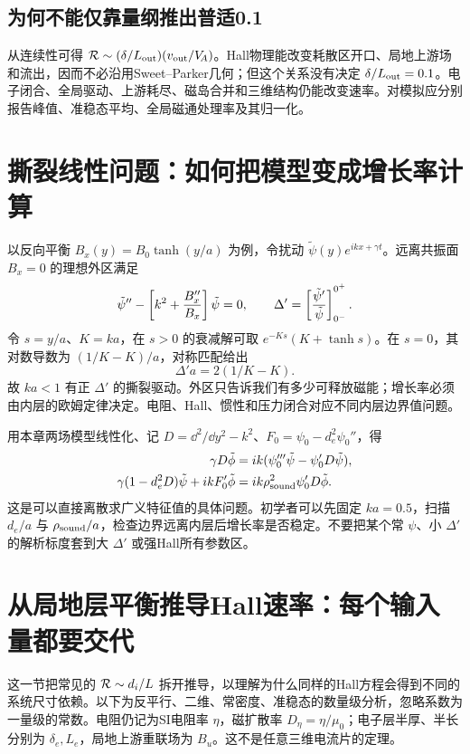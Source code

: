 \subsection{为何不能仅靠量纲推出普适0.1}
从连续性可得 $\mathcal R\sim(\delta/L_{\rm out})(v_{\rm out}/V_{\!A})$。Hall物理能改变耗散区开口、局地上游场和流出，因而不必沿用Sweet--Parker几何；但这个关系没有决定 $\delta/L_{\rm out}=0.1$。电子闭合、全局驱动、上游耗尽、磁岛合并和三维结构仍能改变速率。对模拟应分别报告峰值、准稳态平均、全局磁通处理率及其归一化。



\section{撕裂线性问题：如何把模型变成增长率计算}
以反向平衡 $B_x(y)=B_0\tanh(y/a)$ 为例，令扰动 $\tilde\psi(y)e^{ikx+\gamma t}$。远离共振面 $B_x=0$ 的理想外区满足
\begin{equation}\tilde\psi''-\left[k^2+{B_x''\over B_x}\right]\tilde\psi=0,\qquad
\Delta'=\left[{\tilde\psi'\over\tilde\psi}\right]_{0^-}^{0^+}.
\end{equation}
令 $s=y/a$、$K=ka$，在 $s>0$ 的衰减解可取 $e^{-Ks}(K+\tanh s)$。在 $s=0$，其对数导数为 $(1/K-K)/a$，对称匹配给出
\begin{equation}\Delta'a=2(1/K-K).
\end{equation}
故 $ka<1$ 有正 $\Delta'$ 的撕裂驱动。外区只告诉我们有多少可释放磁能；增长率必须由内层的欧姆定律决定。电阻、Hall、惯性和压力闭合对应不同内层边界值问题。

用本章两场模型线性化、记 $D=\dd^2/\dd y^2-k^2$、$F_0=\psi_0-d_e^2\psi_0''$，得
\begin{align}
\gamma D\tilde\phi&=ik(\psi_0'''\tilde\psi-\psi_0'D\tilde\psi),\\
\gamma(1-d_e^2D)\tilde\psi+ikF_0'\tilde\phi&=ik\rho_{\rm sound}^2\psi_0'D\tilde\phi.
\end{align}
这是可以直接离散求广义特征值的具体问题。初学者可以先固定 $ka=0.5$，扫描 $d_e/a$ 与 $\rho_{\rm sound}/a$，检查边界远离内层后增长率是否稳定。不要把某个常 $\psi$、小 $\Delta'$ 的解析标度套到大 $\Delta'$ 或强Hall所有参数区。



\section{从局地层平衡推导Hall速率：每个输入量都要交代}
这一节把常见的 $\mathcal R\sim d_i/L$ 拆开推导，以理解为什么同样的Hall方程会得到不同的系统尺寸依赖。以下为反平行、二维、常密度、准稳态的数量级分析，忽略系数为一量级的常数。电阻仍记为SI电阻率 $\eta$，磁扩散率 $D_\eta=\eta/\mu_0$；电子层半厚、半长分别为 $\delta_e,L_e$，局地上游重联场为 $B_u$。这不是任意三维电流片的定理。\citep{Malyshkin2008,Simakov2009}


